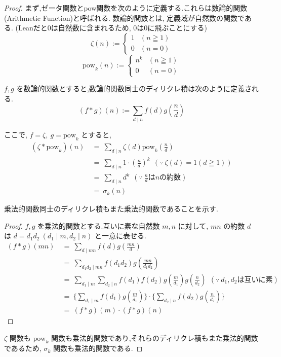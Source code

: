 \begin{proof}
まず,ゼータ関数とpow関数を次のように定義する.これらは数論的関数(Arithmetic Function)と呼ばれる.
数論的関数とは, 定義域が自然数の関数である. (Leanだと0は自然数に含まれるため, 0は0に飛ぶことにする)
\[\zeta(n) :=
\begin{cases} 1 & (n \geqq 1)\\
              0 & (n = 0)
\end{cases}\]
\[\mathrm{pow}_k(n) :=
\begin{cases} n^k & (n \geqq 1)\\
                0 & (n = 0)
\end{cases}\]

\(f, g\) を数論的関数とすると,数論的関数同士のディリクレ積は次のように定義される.
\[(f \ast g)(n) := \sum_{d \mid n} f(d)g(\frac{n}{d})\]

ここで, \(f = \zeta, ~g = \mathrm{pow}_k\) とすると,
\begin{align*}
  (\zeta \ast \mathrm{pow}_k)(n) ~&=~ \sum_{d \mid n} \zeta(d) \mathrm{pow}_k(\frac{n}{d})\\
                                 ~&=~ \sum_{d \mid n} 1 \cdot (\frac{n}{d})^k~~(\because~\zeta(d) = 1 (d \geqq 1))\\
                                 ~&=~ \sum_{d \mid n} d ^ k~~(\because ~\frac{n}{d} \text{は} n \text{の約数})\\
                                 ~&=~ \sigma_k(n)
\end{align*}

乗法的関数同士のディリクレ積もまた乗法的関数であることを示す.
\begin{proof}
\(f, g\) を乗法的関数とする.互いに素な自然数 \(m, n\) に対して,
\(mn\) の約数 \(d\) は \(d = d_1d_2 ~(d_1 \mid m, d_2 \mid n)\) と一意に表せる.
\begin{align*}
  (f \ast g)(mn) ~&=~ \sum_{d \mid mn} f(d)g(\frac{mn}{d})\\
                 ~&=~ \sum_{d_1d_2 \mid mn} f(d_1d_2)g(\frac{mn}{d_1d_2})\\
                 ~&=~ \sum_{d_1 \mid m} \sum_{d_2 \mid n} f(d_1)f(d_2)g(\frac{m}{d_1})g(\frac{n}{d_2})~~(\because ~d_1, d_2 \text{は互いに素})\\
                 ~&=~ \{\sum_{d_1 \mid m} f(d_1)g(\frac{m}{d_1})\} \cdot \{\sum_{d_2 \mid n} f(d_2)g(\frac{n}{d_2})\}\\
                 ~&=~ (f \ast g)(m) \cdot (f \ast g)(n)
\end{align*}\end{proof}
\(\zeta\) 関数も \(\mathrm{pow}_k\) 関数も乗法的関数であり,それらのディリクレ積もまた乗法的関数であるため,
\(\sigma_k\) 関数も乗法的関数である.
\end{proof}


